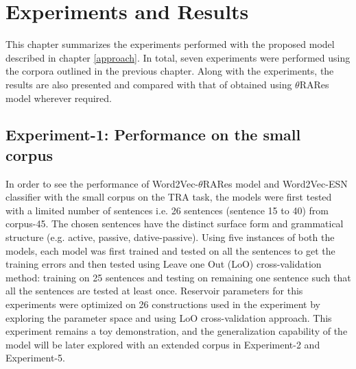 \chapter{Experiments and Results}\label{results}

This chapter summarizes the experiments performed with the proposed model described in chapter \ref{approach}. In total, seven experiments were performed using the corpora outlined in the previous chapter. Along with the experiments, the results are also presented and compared with that of obtained using $\theta$RARes model wherever required. 

\section{Experiment-1: Performance on the small corpus}

In order to see the performance of Word2Vec-$\theta$RARes model and Word2Vec-ESN classifier with the small corpus on the TRA task, the models were first tested with a limited number of sentences i.e. 26 sentences (sentence 15 to 40) from corpus-45. The chosen sentences have the distinct surface form and grammatical structure (e.g. active, passive, dative-passive). Using five instances of both the models, each model was first trained and tested on all the sentences to get the training errors and then tested using Leave one Out (LoO) cross-validation method: training on 25 sentences and testing on remaining one sentence such that all the sentences are tested at least once. Reservoir parameters for this experiments were optimized on 26 constructions used in the experiment by exploring the parameter space and using LoO cross-validation approach. This experiment remains a toy demonstration, and the generalization capability of the model will be later explored with an extended corpus in Experiment-2 and Experiment-5.

